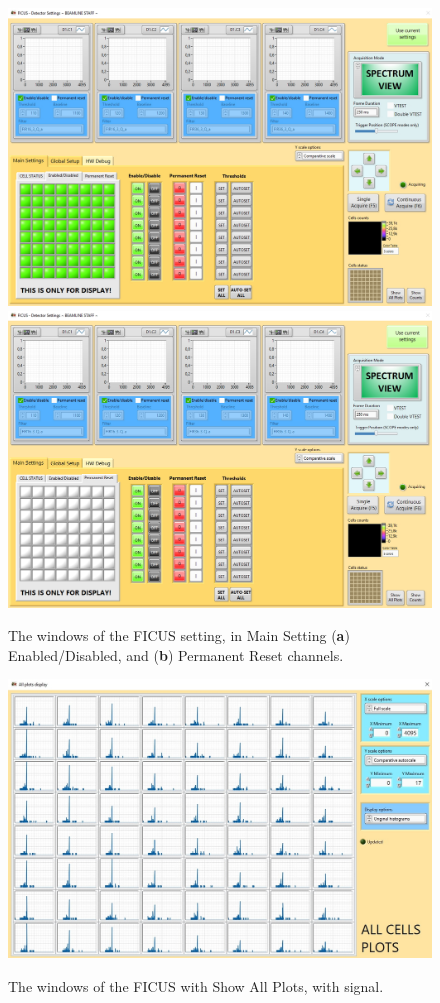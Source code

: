 \documentclass[a4paper,12pt,oneside,pdflatex,italian,final,twocolumn]{article}
\begin{document}
\begin{figure}[h]
\centering
\subfloat
{\includegraphics[width=.48\textwidth]{Cattura104.jpg}} \quad
\subfloat
{\includegraphics[width=.48\textwidth]{Cattura105.jpg}} \\
\caption{The windows of the FICUS setting, in Main Setting (\textbf{a}) Enabled/Disabled, and (\textbf{b}) Permanent Reset channels.}\label{fig:fig37}
\end{figure}

\begin{figure}[h]
\centering
{\includegraphics[width=.80\textwidth]{Capture56.jpg}} \quad
\caption{The windows of the FICUS with Show All Plots, with signal.}\label{fig:fig38}
\end{figure}
\end{document}
